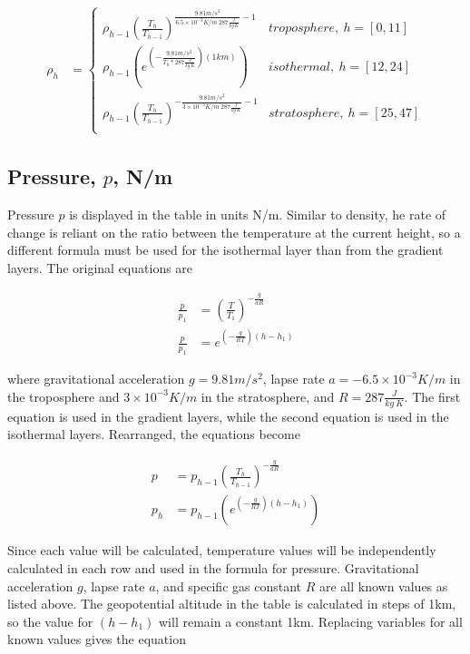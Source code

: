 \documentclass{article}
\begin{document}
\begin{align}
    \rho_h &= \begin{cases}
    \rho_{h-1}{\left(\frac{T_h}{T_{h-1}}\right)}^{\frac{9.81 m/s^2}{6.5\times10^{-3}K/m\ 287 \frac{J}{kg\ K}}-1}    & troposphere,\ h = [0,11] \\
    \rho_{h-1}\left(e^{\left(- \frac{9.81 m/s^2}{T_h * 287 \frac{J}{kg\ K} }\right)\left(1 km\right)}\right)                                          & isothermal,\ h = [12,24] \\
    \rho_{h-1}{\left(\frac{T_h}{T_{h-1}}\right)}^{-\frac{9.81 m/s^2}{3\times10^{-3}K/m\ 287 \frac{J}{kg\ K}}-1}       & stratosphere,\ h = [25,47] \\
    \end{cases}
\end{align}

\subsection{Pressure, $p$, N/m}
Pressure $p$ is displayed in the table in units N/m. Similar to density, he rate of change is reliant on the ratio between the temperature at the current height, so a different formula must be used for the isothermal layer than from the gradient layers. The original equations are 

\begin{align*}
    \frac{p}{p_1} &= {\left(\frac{T}{T_1}\right)}^{-\frac{g}{aR}} \\
    \frac{p}{p_1} &= e^{\left(- \frac{g}{RT}\right)\left(h-h_1\right)}
\end{align*}

where gravitational acceleration $g = 9.81m/s^2$, lapse rate $a= -6.5\times10^{-3} K/m$ in the troposphere and $3\times10^{-3}K/m$ in the stratosphere, and $R = 287 \frac{J}{kg\ K}$. The first equation is used in the gradient layers, while the second equation is used in the isothermal layers. Rearranged, the equations become 

\begin{align*}
    p &= p_{h-1}{\left(\frac{T_h}{T_{h-1}}\right)}^{-\frac{g}{aR}} \\
    p_h &= p_{h-1}\left(e^{\left(- \frac{g}{RT}\right)\left(h-h_1\right)}\right)
\end{align*}

Since each value will be calculated, temperature values will be independently calculated in each row and used in the formula for pressure. Gravitational acceleration $g$, lapse rate $a$, and specific gas constant $R$ are all known values as listed above. The geopotential altitude in the table is calculated in steps of 1km, so the value for $(h-h_1)$ will remain a constant 1km. Replacing variables for all known values gives the equation
\end{document}
